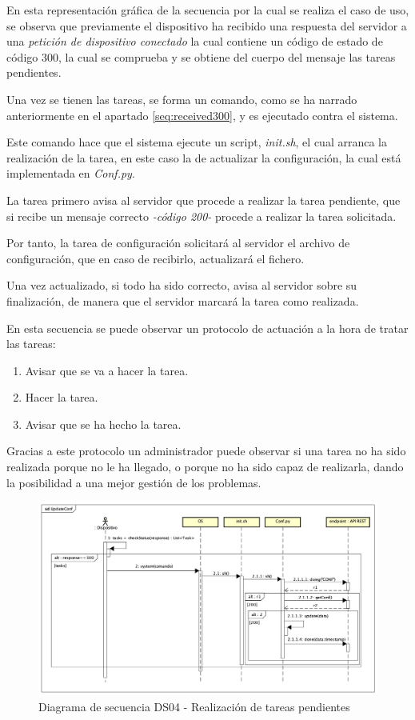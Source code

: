 En esta representación gráfica de la secuencia por la cual se realiza el caso de uso, se observa que previamente el dispositivo ha recibido una respuesta del servidor a una \textit{petición de dispositivo conectado} la cual contiene un código de estado de código 300, la cual se comprueba y se obtiene del cuerpo del mensaje las tareas pendientes.

Una vez se tienen las tareas, se forma un comando, como se ha narrado anteriormente en el apartado \ref{seq:received300}, y es ejecutado contra el sistema.

Este comando hace que el sistema ejecute un script, \textit{init.sh}, el cual arranca la realización de la tarea, en este caso la de actualizar la configuración, la cual está implementada en \textit{Conf.py}.

La tarea primero avisa al servidor que procede a realizar la tarea pendiente, que si recibe un mensaje correcto \textit{-código 200-} procede a realizar la tarea solicitada.

Por tanto, la tarea de configuración solicitará al servidor el archivo de configuración, que en caso de recibirlo, actualizará el fichero.

Una vez actualizado, si todo ha sido correcto, avisa al servidor sobre su finalización, de manera que el servidor marcará la tarea como realizada.

En esta secuencia se puede observar un protocolo de actuación a la hora de tratar las tareas:

\begin{enumerate}
    \item Avisar que se va a hacer la tarea.
    \item Hacer la tarea.
    \item Avisar que se ha hecho la tarea.
\end{enumerate}

Gracias a este protocolo un administrador puede observar si una tarea no ha sido realizada porque no le ha llegado, o porque no ha sido capaz de realizarla, dando la posibilidad a una mejor gestión de los problemas.

\begin{figure}[H]
    \centering
    \includegraphics[width=14cm]{./img/sequence/diagram/conftask.png}
    \caption{Diagrama de secuencia DS04 - Realización de tareas pendientes}
    \label{fig:seq.alive}
\end{figure}

